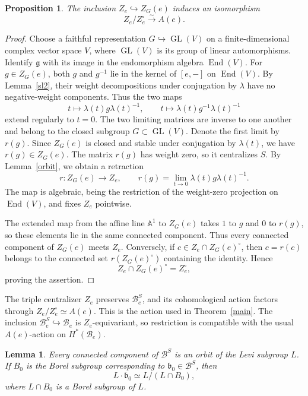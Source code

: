 \documentclass[12pt]{article}
\theoremstyle{paperplain}
\newtheorem{proposition}[theorem]{Proposition}
\newtheorem{lemma}[theorem]{Lemma}
\DeclareMathOperator{\End}{End}
\DeclareMathOperator{\GL}{GL}
\newcommand{\g}{\mathfrak g}
\newcommand{\B}{\mathcal B}
\begin{document}
\begin{proposition}\label{component-group}
    The inclusion $Z_e\hookrightarrow Z_G(e)$ induces an isomorphism
    \[
        Z_e/Z_e^\circ\xrightarrow{\sim}A(e).
    \]
\end{proposition}

\begin{proof}
    Choose a faithful representation $G\hookrightarrow\GL(V)$ on a finite-dimensional complex vector space $V$, where $\GL(V)$ is its group of linear automorphisms. Identify $\g$ with its image in the endomorphism algebra $\End(V)$. For $g\in Z_G(e)$, both $g$ and $g^{-1}$ lie in the kernel of $[e,-]$ on $\End(V)$. By Lemma~\ref{sl2}, their weight decompositions under conjugation by $\lambda$ have no negative-weight components. Thus the two maps
    \[
        t\longmapsto\lambda(t)g\lambda(t)^{-1},\qquad
        t\longmapsto\lambda(t)g^{-1}\lambda(t)^{-1}
    \]
    extend regularly to $t=0$. The two limiting matrices are inverse to one another and belong to the closed subgroup $G\subset \GL(V)$. Denote the first limit by $r(g)$. Since $Z_G(e)$ is closed and stable under conjugation by $\lambda(t)$, we have $r(g)\in Z_G(e)$. The matrix $r(g)$ has weight zero, so it centralizes $S$. By Lemma~\ref{orbit}, we obtain a retraction
    \[
        r\colon Z_G(e)\longrightarrow Z_e,\qquad
        r(g)=\lim_{t\to0}\lambda(t)g\lambda(t)^{-1}.
    \]
    The map is algebraic, being the restriction of the weight-zero projection on $\End(V)$, and fixes $Z_e$ pointwise.

    The extended map from the affine line $\mathbb A^1$ to $Z_G(e)$ takes $1$ to $g$ and $0$ to $r(g)$, so these elements lie in the same connected component. Thus every connected component of $Z_G(e)$ meets $Z_e$. Conversely, if $c\in Z_e\cap Z_G(e)^\circ$, then $c=r(c)$ belongs to the connected set $r(Z_G(e)^\circ)$ containing the identity. Hence
    \[
        Z_e\cap Z_G(e)^\circ=Z_e^\circ,
    \]
    proving the assertion.
\end{proof}

The triple centralizer $Z_e$ preserves $\B_e^S$, and its cohomological action factors through $Z_e/Z_e^\circ\simeq A(e)$. This is the action used in Theorem~\ref{main}. The inclusion $\B_e^S\hookrightarrow\B_e$ is $Z_e$-equivariant, so restriction is compatible with the usual $A(e)$-action on $H^*(\B_e)$.

\begin{lemma}\label{fixed-flags}
    Every connected component of $\B^S$ is an orbit of the Levi subgroup $L$. If $B_0$ is the Borel subgroup corresponding to $\mathfrak b_0\in\B^S$, then
    \[
        L\cdot\mathfrak b_0\simeq L/(L\cap B_0),
    \]
    where $L\cap B_0$ is a Borel subgroup of $L$.
\end{lemma}
\end{document}
